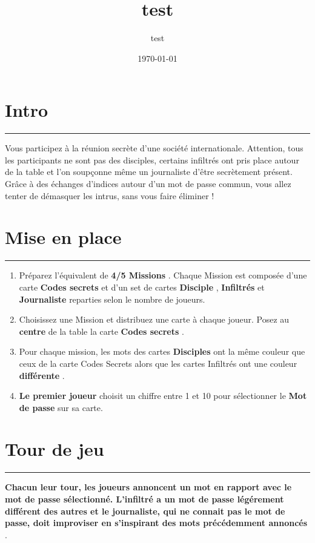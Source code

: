 \documentclass{article}%
\title{test}%
\author{test}%
\date{\today}%
\begin{document}
%
\normalsize%
\maketitle\thispagestyle{header}%
\pagestyle{header}%
\section{ Intro
}%
\label{sec:Intro}%
\rule{18cm}{0.07cm}\break%
Vous participez à la réunion secrète d'une société internationale. Attention, tous les participants ne sont pas des disciples, certains infiltrés ont pris place autour de la table et l'on soupçonne même un journaliste d'être secrètement présent. Grâce à des échanges d'indices autour d'un mot de passe commun, vous allez tenter de démasquer les intrus, sans vous faire éliminer !


%
\section{ Mise en place
}%
\label{sec:Miseenplace}%
\rule{18cm}{0.07cm}\break%
\begin{enumerate}%
\item%
%
 Préparez l'équivalent de %
\textbf{4/5 Missions}%
. Chaque Mission est composée d'une carte %
\textbf{Codes secrets}%
\textit{ }%
 et d'un set de cartes %
\textbf{Disciple}%
,%
\textbf{ Infiltrés}%
\textit{ }%
 et %
\textbf{Journaliste}%
\textit{ }%
 reparties selon le nombre de joueurs.
%
\item%
%
 Choisissez une Mission et distribuez une carte à chaque joueur. Posez au %
\textbf{centre}%
\textit{ }%
 de la table la carte %
\textbf{Codes secrets}%
.
%
\item%
%
 Pour chaque mission, les mots des cartes %
\textbf{Disciples}%
\textit{ }%
 ont la même couleur que ceux de la carte Codes Secrets alors que les cartes Infiltrés ont une couleur %
\textbf{différente}%
.
%
\item%
%
\textbf{Le premier joueur}%
\textit{ }%
 choisit un chiffre entre 1 et 10 pour sélectionner le %
\textbf{Mot de passe}%
\textit{ }%
 sur sa carte.
%
\end{enumerate}

%
\section{ Tour de jeu
}%
\label{sec:Tourdejeu}%
\rule{18cm}{0.07cm}\break%
\textbf{Chacun leur tour, les joueurs annoncent un mot en rapport avec le mot de passe sélectionné. L'infiltré a un mot de passe légérement différent des autres et le journaliste, qui ne connait pas le mot de passe, doit improviser en s'inspirant des mots précédemment annoncés}%
.
\end{document}
